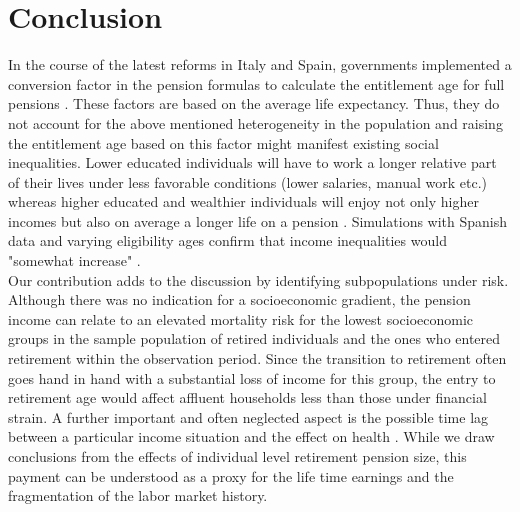 \documentclass[a4paper,10pt,oneside,english]{article}
\begin{document}

\section*{\textsf{Conclusion}}
In the course of the latest reforms in Italy and Spain, governments implemented a conversion factor in the pension formulas to calculate the entitlement age for full pensions \cite{Hernandez2017,RN53}. These factors are based on the average life expectancy. Thus, they do not account for the above mentioned heterogeneity in the population and raising the entitlement age based on this factor might manifest existing social inequalities. Lower educated individuals will have to work a longer relative part of their lives under less favorable conditions (lower salaries, manual work etc.) whereas higher educated and wealthier individuals will enjoy not only higher incomes but also on average a longer life on a pension \cite{Sanchez2014,Hernandez2017}. Simulations with Spanish data and varying eligibility ages confirm that income inequalities would "somewhat increase" \cite[][p.149]{RN61}.\\
Our contribution adds to the discussion by identifying subpopulations under risk. Although there was no indication for a socioeconomic gradient, the pension income can relate to an elevated mortality risk for the lowest socioeconomic groups in the sample population of retired individuals and the ones who entered retirement within the observation period. Since the transition to retirement often goes hand in hand with a substantial loss of income for this group, the entry to retirement age would affect affluent households less than those under financial strain. 
A further important and often neglected aspect is the possible time lag between a particular income situation and the effect on health \citep{RN2,RN50}. While we draw conclusions from the effects of individual level retirement pension size, this payment can be understood as a proxy for the life time earnings and the fragmentation of the labor market history.\\
\end{document}
